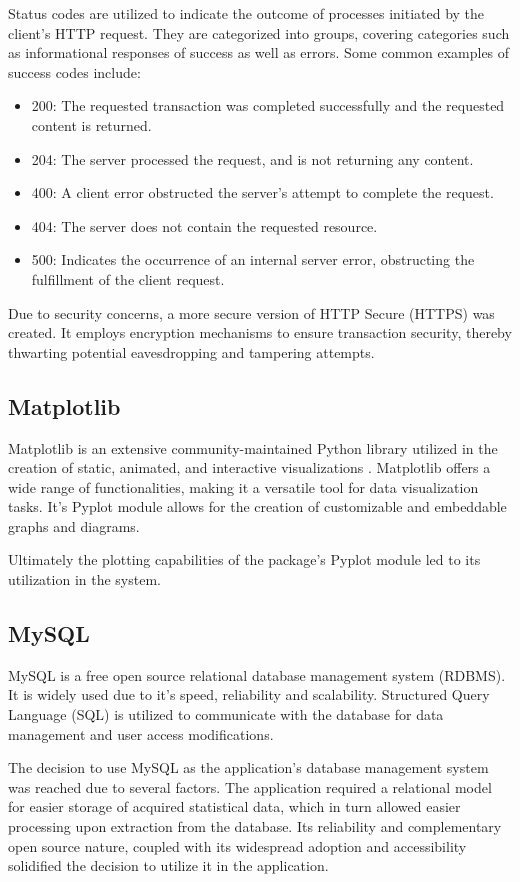 \documentclass{thesis-ekf}
\theoremstyle{definition}
\theoremstyle{remark}
\begin{document}
{Status codes are utilized to indicate the outcome of processes initiated by the client's HTTP request. They are categorized into groups, covering categories such as informational responses of success as well as errors. Some common examples of success codes include:
\begin{itemize}
	\item 200: The requested transaction was completed successfully and the requested content is returned.
	\item 204: The server processed the request, and is not returning any content.
	\item 400: A client error obstructed the server's attempt to complete the request.
	\item 404: The server does not contain the requested resource.
	\item 500: Indicates the occurrence of an internal server error, obstructing the fulfillment of the client request.
\end{itemize}

Due to security concerns, a more secure version of HTTP Secure (HTTPS) \cite{wiki-https} was created. It employs encryption mechanisms to ensure transaction security, thereby thwarting potential eavesdropping and tampering attempts. 

\subsection{Matplotlib}
Matplotlib is an extensive community-maintained Python library utilized in the creation of static, animated, and interactive visualizations \cite{matplotlib}. Matplotlib offers a wide range of functionalities, making it a versatile tool for data visualization tasks. It's Pyplot module allows for the creation of customizable and embeddable graphs and diagrams.

Ultimately the plotting capabilities of the package's Pyplot module led to its utilization in the system.

\subsection{MySQL}
MySQL is a free open source relational database management system (RDBMS). It is widely used due to it's speed, reliability and scalability. Structured Query Language (SQL) is utilized to communicate with the database for data management and user access modifications. \cite{wiki-mysql}

The decision to use MySQL as the application's database management system was reached due to several factors. The application required a relational model for easier storage of acquired statistical data, which in turn allowed easier processing upon extraction from the database. Its reliability and complementary open source nature, coupled with its widespread adoption and accessibility solidified the decision to utilize it in the application.

}
\end{document}
